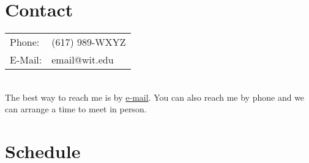 \documentclass{wit_schedule2}
\author{Professor Foo}
\date{Spring 1984}
\begin{document}
\section*{Contact}

\begin{tabular}{l l}
Phone: & (617) 989-WXYZ \\
E-Mail: & email@wit.edu \\
\end{tabular}
\\

The best way to reach me is by \underline{e-mail}. You can also reach me by phone and we can arrange a time to meet in person.

\section*{Schedule}

\begin{ScheduleWeek}

	
	
	

\end{ScheduleWeek}
\end{document}
